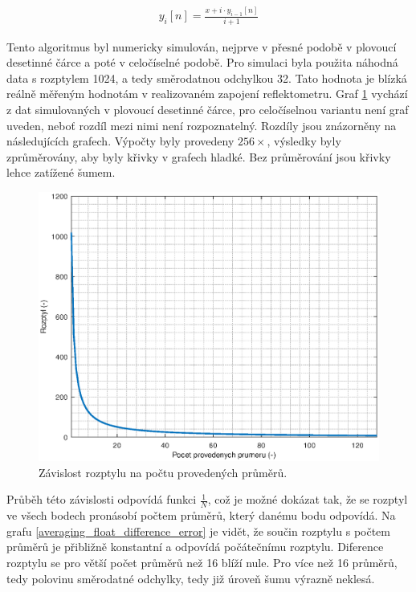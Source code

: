 \begin{equation}
\begin{gathered}
	y_i[n]=	\frac{x+i \cdot y_{i-1}[n]}{i+1}
\end{gathered}
\end{equation}

Tento algoritmus byl numericky simulován, nejprve v přesné podobě v plovoucí desetinné čárce a poté v celočíselné podobě. Pro simulaci byla použita náhodná data s rozptylem 1024, a tedy směrodatnou odchylkou 32. Tato hodnota je blízká reálně měřeným hodnotám v realizovaném zapojení reflektometru. Graf \ref{averaging_variance} vychází z dat simulovaných v plovoucí desetinné čárce, pro celočíselnou variantu není graf uveden, neboť rozdíl mezi nimi není rozpoznatelný. Rozdíly jsou znázorněny na následujících grafech. Výpočty byly provedeny $256\times$, výsledky byly zprůměrovány, aby byly křivky v grafech hladké. Bez průměrování jsou křivky lehce zatížené šumem.

\begin{figure}[htbp]
\includegraphics[width=\textwidth,keepaspectratio]{images/averaging_float_variance.eps}\caption{Závislost rozptylu na počtu provedených průměrů.}\label{averaging_variance}
\end{figure}	

Průběh této závislosti odpovídá funkci $\frac{1}{N}$, což je možné dokázat tak, že se rozptyl ve všech bodech pronásobí počtem průměrů, který danému bodu odpovídá. Na grafu \ref{averaging_float_difference_error} je vidět, že součin rozptylu s počtem průměrů je přibližně konstantní a odpovídá počátečnímu rozptylu. Diference rozptylu se pro větší počet průměrů než 16 blíží nule. Pro více než 16 průměrů, tedy polovinu směrodatné odchylky, tedy již úroveň šumu výrazně neklesá.


